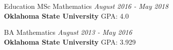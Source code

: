 \documentclass{resume} %
\begin{document}
\begin{rSection}{Education}
MSc Mathematics \hfill {\em August 2016 - May 2018} \\
{\bf Oklahoma State University}  \hfill {GPA: 4.0} 

BA Mathematics \hfill {\em August 2013 - May 2016} \\
{\bf Oklahoma State University} \hfill {GPA: 3.929} \\
\end{rSection}

\end{document}
